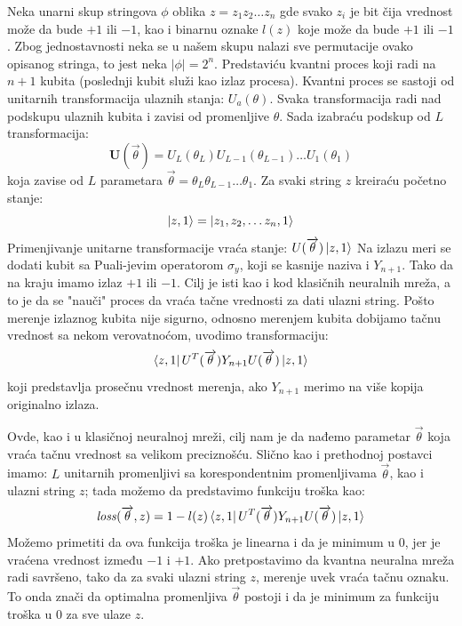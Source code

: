 \documentclass[12pt, letterpaper, oneside]{article}
\begin{document}
Neka unarni skup stringova $\phi$ oblika $z=z_1 z_2 \dots z_n$ gde svako $z_i$ je bit čija vrednost može da bude $+1$ ili $-1$,
kao i binarnu oznake $l(z)$ koje može da bude $+1$ ili $-1$. Zbog jednostavnosti neka se u našem skupu nalazi sve permutacije ovako opisanog stringa, to jest neka $|\phi|=2^n$.
Predstaviću kvantni proces koji radi na $n+1$ kubita (poslednji kubit služi kao izlaz procesa). Kvantni proces se sastoji od unitarnih transformacija ulaznih stanja: ${U_a(\theta)}$.
Svaka transformacija radi nad podskupu ulaznih kubita i zavisi od promenljive $\theta$. Sada izabraću podskup od $L$ transformacija:
\[
  \mathbf{U}(\overrightarrow{\theta}) = U_{L}(\theta_{L}) U_{L-1}(\theta_{L-1}) \dots U_{1}(\theta_{1}) 
\]
koja zavise od $L$ parametara $\overrightarrow{\theta}=\theta_{L} \theta_{L-1} \dots \theta_{1}$. Za svaki string $z$ kreiraću početno stanje:
\[
    \Ket{z,1} = \Ket{z_1, z_2, \dots z_n, 1}
\]
Primenjivanje unitarne transformacije vraća stanje: $U(\overrightarrow{\theta})\Ket{z,1}$
Na izlazu meri se dodati kubit sa Puali-jevim operatorom $\sigma_y$, koji se kasnije naziva i $Y_{n+1}$.
Tako da na kraju imamo izlaz $+1$ ili $-1$. Cilj je isti kao i kod klasičnih neuralnih mreža, a to je da se "nauči" proces da vraća tačne vrednosti za dati ulazni string.
Pošto merenje izlaznog kubita nije sigurno, odnosno merenjem kubita dobijamo tačnu vrednost sa nekom verovatnoćom, uvodimo transformaciju:
\[
    \bra{z,1}U^T(\overrightarrow{\theta})Y_{n+1}U(\overrightarrow{\theta})\Ket{z,1}
\]
koji predstavlja prosečnu vrednost merenja, ako $Y_{n+1}$ merimo na više kopija originalno izlaza.

Ovde, kao i u klasičnoj neuralnoj mreži, cilj nam je da nađemo parametar $\overrightarrow{\theta}$ koja vraća tačnu vrednost sa velikom preciznošću.
Slično kao i prethodnoj postavci imamo: $L$ unitarnih promenljivi sa korespondentnim promenljivama $\overrightarrow{\theta}$, kao i ulazni string $z$; 
tada možemo da predstavimo funkciju troška kao:
\[
    \mathit{loss}(\overrightarrow{\theta},z) = 1 - l(z)\bra{z,1}U^T(\overrightarrow{\theta})Y_{n+1}U(\overrightarrow{\theta})\Ket{z,1}
\]
Možemo primetiti da ova funkcija troška je linearna i da je minimum u $0$, jer je vraćena vrednost između $-1$ i $+1$.
Ako pretpostavimo da kvantna neuralna mreža radi savršeno, tako da za svaki ulazni string $z$, merenje uvek vraća tačnu oznaku.
To onda znači da optimalna promenljiva $\overrightarrow{\theta}$ postoji i da je minimum za funkciju troška u $0$ za sve ulaze $z$.
\end{document}
